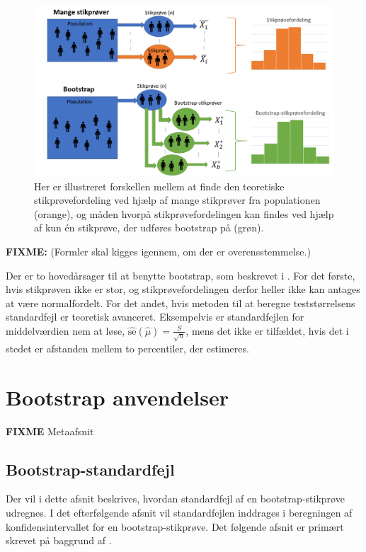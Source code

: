 \documentclass[
]{book}
\theoremstyle{definition}
\theoremstyle{definition}
\theoremstyle{definition}
\theoremstyle{remark}
\begin{document}
\begin{figure}

{\centering \includegraphics[width=0.75\linewidth]{images/normalvboot}

}

\caption{Her er illustreret forskellen mellem at finde den teoretiske stikprøvefordeling ved hjælp af mange stikprøver fra populationen (orange), og måden hvorpå stikprøvefordelingen kan findes ved hjælp af kun én stikprøve, der udføres bootstrap på (grøn).}\label{fig:figur-Bootstrap-illustration}
\end{figure}

\textbf{FIXME:} (Formler skal kigges igennem, om der er overensstemmelse.)

Der er to hovedårsager til at benytte bootstrap, som beskrevet i \citep{BootYouTube1}. For det første, hvis stikprøven ikke er stor, og stikprøvefordelingen derfor heller ikke kan antages at være normalfordelt. For det andet, hvis metoden til at beregne teststørrelsens standardfejl er teoretisk avanceret. Eksempelvis er standardfejlen for middelværdien nem at løse, \(\hat{\text{se}}(\hat{\mu}) = \frac{S}{\sqrt{n}}\), mens det ikke er tilfældet, hvis det i stedet er afstanden mellem to percentiler, der estimeres.

\hypertarget{bootstrap-anvendelser}{%
\chapter{Bootstrap anvendelser}\label{bootstrap-anvendelser}}

\textbf{FIXME} Metaafsnit

\hypertarget{bootstrap-standardfejl}{%
\section{Bootstrap-standardfejl}\label{bootstrap-standardfejl}}

Der vil i dette afsnit beskrives, hvordan standardfejl af en bootstrap-stikprøve udregnes. I det efterfølgende afsnit vil standardfejlen inddrages i beregningen af konfidensintervallet for en bootstrap-stikprøve. Det følgende afsnit er primært skrevet på baggrund af \citep{TDSBootstrap}.
\end{document}
